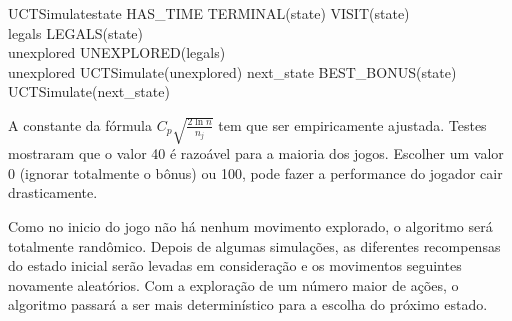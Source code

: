 \begin{pseudocode}{UCTSimulate}{state}
\WHILE HAS\_TIME \DO
\BEGIN
	\WHILE \NOT TERMINAL(state) \DO
		\BEGIN
		VISIT(state)\\
		legals \GETS LEGALS(state)\\
	    unexplored \GETS UNEXPLORED(legals)\\
		\IF unexplored
		\THEN
		\BEGIN
			UCTSimulate(unexplored)
		\END	
		\ELSE
		\BEGIN
			next\_state \GETS BEST\_BONUS(state)\\
			UCTSimulate(next\_state)\\
		\END
	\END
\END
\end{pseudocode}

A constante da fórmula $C_{p}\sqrt{\frac{2\ln n}{n_{j}}}$ tem que ser empiricamente ajustada. Testes mostraram que o valor 40 é razoável para a maioria dos jogos. Escolher um valor 0 (ignorar totalmente o bônus) ou 100, pode fazer a performance do jogador cair drasticamente.

Como no inicio do jogo não há nenhum movimento explorado, o algoritmo será totalmente randômico. Depois de algumas simulações, as diferentes recompensas do estado inicial serão levadas em consideração e os movimentos seguintes novamente aleatórios. Com a exploração de um número maior de ações, o algoritmo passará a ser mais determinístico para a escolha do próximo estado.